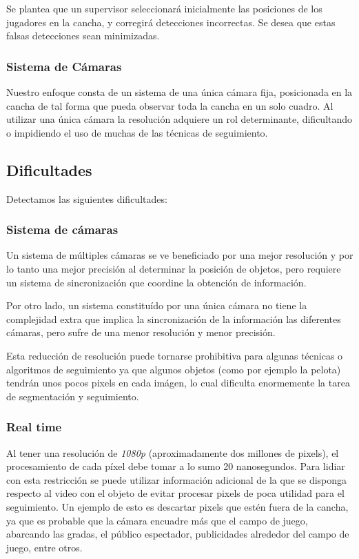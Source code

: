 \documentclass[a4paper,10pt]{article}
\begin{document}
Se plantea que un supervisor seleccionará inicialmente las posiciones de los
jugadores en la cancha, y corregirá detecciones incorrectas. Se desea que estas
falsas detecciones sean minimizadas.

\subsubsection{Sistema de Cámaras}

Nuestro enfoque consta de un sistema de una única cámara fija, posicionada en
la cancha de tal forma que pueda observar toda la cancha en un solo cuadro. Al
utilizar una única cámara la resolución adquiere un rol determinante,
dificultando o impidiendo el uso de muchas de las técnicas de seguimiento.

\subsection{Dificultades}

Detectamos las siguientes dificultades:

\subsubsection{Sistema de cámaras}

Un sistema de múltiples cámaras se ve beneficiado por una mejor resolución y
por lo tanto una mejor precisión al determinar la posición de objetos, pero
requiere un sistema de sincronización que coordine la obtención de información.

Por otro lado, un sistema constituído por una única cámara no tiene la
complejidad extra que implica la sincronización de la información las
diferentes cámaras, pero sufre de una menor resolución y menor precisión.

Esta reducción de resolución puede tornarse prohibitiva para algunas técnicas o
algoritmos de seguimiento ya que algunos objetos (como por ejemplo la pelota)
tendrán unos pocos pixels en cada imágen, lo cual dificulta enormemente la
tarea de segmentación y seguimiento.

\subsubsection{Real time}

Al tener una resolución de \textit{1080p} (aproximadamente dos millones de
pixels), el procesamiento de cada píxel debe tomar a lo sumo 20 nanosegundos.
Para lidiar con esta restricción se puede utilizar información adicional de la
que se disponga respecto al video con el objeto de evitar procesar pixels de
poca utilidad para el seguimiento. Un ejemplo de esto es descartar pixels que
estén fuera de la cancha, ya que es probable que la cámara encuadre más que el
campo de juego, abarcando las gradas, el público espectador, publicidades
alrededor del campo de juego, entre otros.
\end{document}
